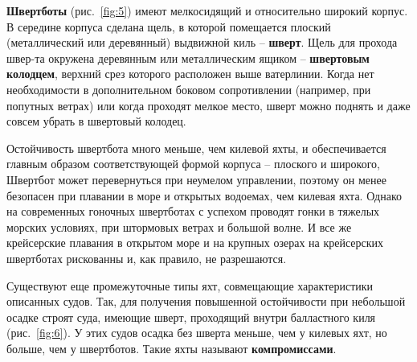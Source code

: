 \documentclass[a4paper, 12pt, twoside, final]{scrbook}
\begin{document}
\textbf{Швертботы} (рис.~\ref{fig:5})
имеют мелкосидящий и относительно широкий корпус. В середине корпуса
сделана щель, в которой помещается плоский (металлический или деревянный)
выдвижной киль \--- \textbf{шверт}. Щель для прохода
швер-та окружена деревянным или металлическим ящиком \--- \textbf{швертовым
колодцем}, верхний срез
которого расположен выше ватерлинии. Когда нет необходимости в дополнительном
боковом сопротивлении (например, при попутных ветрах) или когда проходят
мелкое место, шверт можно поднять и даже совсем убрать в швертовый
колодец.

Остойчивость швертбота много меньше, чем килевой яхты, и обеспечивается
главным образом соответствующей формой корпуса \--- плоского и широкого,
Швертбот может перевернуться при неумелом управлении, поэтому он менее
безопасен при плавании в море и открытых водоемах, чем килевая яхта.
Однако на современных гоночных швертботах с успехом проводят гонки
в тяжелых морских условиях, при штормовых ветрах и большой волне.
И все же крейсерские плавания в открытом море и на крупных озерах
на крейсерских швертботах рискованны и, как правило, не разрешаются.

Существуют еще промежуточные типы яхт, совмещающие характеристики
описанных судов. Так, для получения повышенной остойчивости при небольшой
осадке строят суда, имеющие шверт, проходящий внутри балластного киля
(рис.~\ref{fig:6}).
У этих судов осадка без шверта меньше, чем у килевых яхт, но больше,
чем у швертботов. Такие яхты называют \textbf{компромиссами}.
\end{document}
